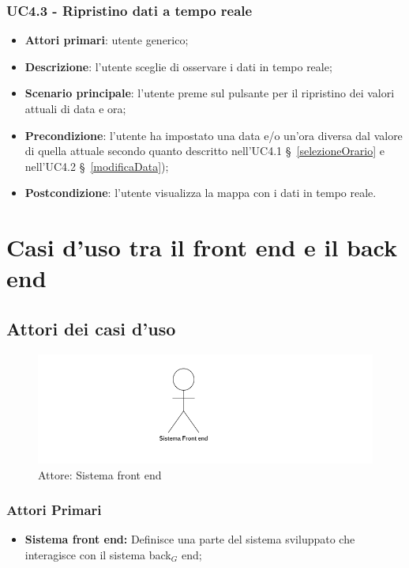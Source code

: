 \subsubsection{UC4.3 - Ripristino dati a tempo reale}\label{ripristinoTempoReale}
\begin{itemize}
	\item \textbf{Attori primari}: utente generico;
	\item \textbf{Descrizione}:  l’utente sceglie di osservare i dati in tempo reale;
	\item \textbf{Scenario principale}: l’utente preme sul pulsante per il ripristino dei valori attuali di data e ora;
	\item \textbf{Precondizione}: l’utente ha impostato una data e/o un’ora diversa dal valore di quella attuale secondo quanto descritto nell'UC4.1 \S~\ref{selezioneOrario} e nell'UC4.2 \S~\ref{modificaData});
	\item \textbf{Postcondizione}: l’utente visualizza la mappa con i dati in tempo reale.
\end{itemize}

\section{Casi d'uso tra il front end e il back end}\label{ucFrontEndBackEnd}

\subsection{Attori dei casi d'uso} %
\begin{center}
	\begin{figure}[H]
		\includegraphics{../immagini/attori_casi/sistema_front_end.png}
		\caption{Attore: Sistema front end}
	\end{figure}
\end{center}
\subsubsection{Attori Primari}\label{FBattoriPrimari}
\begin{itemize}
	\item \textbf{Sistema front end:} Definisce una parte del sistema sviluppato che interagisce con il sistema back$_G$ end;
\end{itemize}

